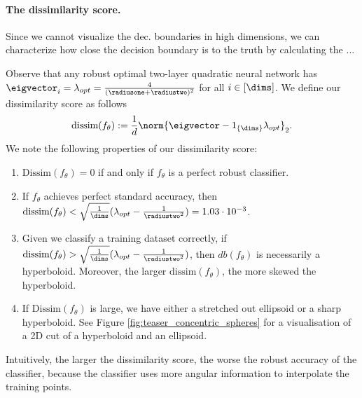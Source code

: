 


\paragraph{The dissimilarity score.}

Since we cannot visualize the dec. boundaries in high dimensions, we can characterize how close the decision boundary is to the truth by calculating the ...

  Observe that any robust optimal two-layer quadratic neural network has $\eigvector_i = \lambda_{opt} = \frac{4}{(\radiusone+\radiustwo)^2}$ for all $i \in [\dims]$. We define our dissimilarity score as follows
\begin{equation}
    \text{dissim}(f_{\theta}) := \frac{1}{d}\norm{\eigvector-1_{\{\dims\}}\lambda_{opt}}_2.
\end{equation}
We note the following properties of our dissimilarity score:
\begin{enumerate}
    \item $\text{Dissim}(f_{\theta})=0$ if and only if $f_{\theta}$ is a perfect robust classifier.
    \item If $f_{\theta}$ achieves perfect standard accuracy, then  $\text{dissim}(f_{\theta})< \sqrt{\frac{1}{\dims}}(\lambda_{opt}-\frac{1}{\radiustwo^2}) = 1.03 \cdot 10^{-3}$. 
    \item Given we classify a training dataset correctly, if $\text{dissim}(f_{\theta}) > \sqrt{\frac{1}{\dims}}(\lambda_{opt}-\frac{1}{\radiustwo^2})$, then $db(f_{\theta})$ is necessarily a hyperboloid. Moreover, the larger $\text{dissim}(f_{\theta})$, the more skewed the hyperboloid.
    \item If $\text{Dissim}(f_{\theta})$ is large, we have either a stretched out ellipsoid or a sharp hyperboloid. See Figure \ref{fig:teaser_concentric_spheres} for a visualisation of a 2D cut of a hyperboloid and an ellipsoid.
\end{enumerate}
Intuitively, the larger the dissimilarity score, the worse the robust accuracy of the classifier, because the classifier uses more angular information to interpolate the training points.

